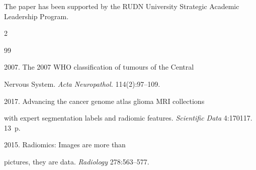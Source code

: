 


\vspace*{-12pt}



\Ack

\noindent

The paper has been supported by the RUDN University Strategic Academic Leadership Program.






  \begin{multicols}{2}



\renewcommand{\bibname}{\protect\rmfamily References}




{\small\frenchspacing

 {%


 \begin{thebibliography}{99}


 2007. The 2007 WHO classification of tumours of the Central 

Nervous System. \textit{Acta Neuropathol.} 114(2):97--109.


 2017. Advancing the cancer genome atlas glioma MRI collections 

with expert segmentation labels and radiomic features. \textit{Scientific Data} 4:170117. 13~p.


 2015. Radiomics: Images are more than 

pictures, they are data. \textit{Radiology} 278:563--577.



\end{thebibliography}}}
\end{multicols}
